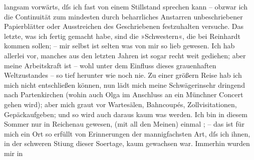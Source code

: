 \begin{ledgroupsized}[t]{13cm}
               langsam vorwärts, dſs ich fast von einem Stillstand sprechen kann – obzwar ich die
               Continuität zum mindesten durch beharrliches Anstarren unbeschriebener Papierblätter
               oder Ausstreichen des Geschriebenen festzuhalten versuche. Das letzte, was ich fertig
               gemacht \introOben{}habe\introOben{}, sind die »Schwestern«, die bei Reinhardt kommen
               sollen; – mir selbst ist selten was von mir so lieb gewesen. Ich hab allerlei vor,
               manches aus den letzten Jahren ist sogar recht weit gediehen; aber meine Arbeitskraft
               ist – wohl unter dem Einfluss dieses grauenhaften Weltzustandes – so tief herunter
               wie noch nie. Zu einer größern Reise hab ich mich nicht entschließen können, nun lädt
               mich meine Schwägerinsehr dringend nach Partenkirchen (wohin auch Olga im
               Anschluss an ein Münchner Concert\strikeout{)} gehen wird); aber mich graut vor Wartesälen,
               Bahncoupés, Zollvisitationen, Gepäckaufgeben; und so wird auch daraus kaum was
               werden. Ich bin in diesem Sommer {\pb}nur in Reichenau gewesen, \label{K_L02327-3v}\label{K_L02327-3h} (mit all den Meinen) einmal \label{K_L02327-4v}\label{K_L02327-4h}; – das ist für mich ein Ort so erfüllt von Erinnerungen der mannigfachsten
               Art, dſs ich ihnen, in der schweren Sti{\geminationm}ung dieser So{\geminationm}ertage, kaum gewachsen war. Immerhin wurden mir in

\end{ledgroupsized}
